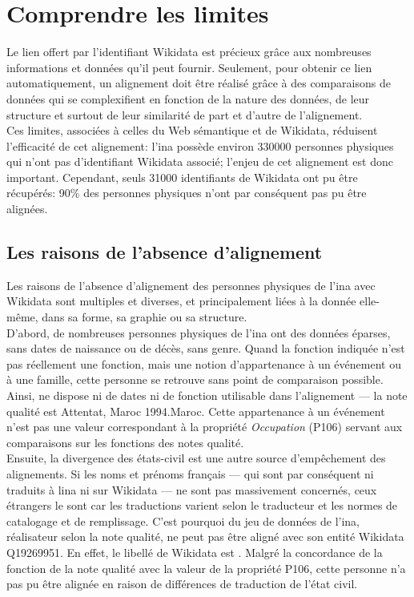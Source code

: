 \section{\label{II-C-4}Comprendre les limites}

Le lien offert par l'identifiant Wikidata est précieux grâce aux nombreuses informations et données qu'il peut fournir. Seulement,  pour obtenir ce lien automatiquement, un alignement doit être réalisé grâce à des comparaisons de données qui se complexifient en fonction de la nature des données, de leur structure et surtout de leur similarité de part et d'autre de l'alignement.\\

Ces limites, associées à celles du Web sémantique et de Wikidata, réduisent  l'efficacité de cet alignement: l'\ac{ina} possède environ 330000 personnes physiques qui n'ont pas d'identifiant Wikidata associé; l'enjeu de cet alignement est donc important. Cependant, seuls 31000 identifiants de Wikidata ont pu être récupérés: 90\% des personnes physiques n'ont par conséquent pas pu être alignées. 

\subsection{\label{II-C-4-a}Les raisons de l'absence d'alignement}

Les raisons de l'absence d'alignement des personnes physiques de l'\ac{ina} avec Wikidata sont multiples et diverses, et principalement liées à la donnée elle-même, dans sa forme, sa graphie ou sa structure.\\

D'abord, de nombreuses personnes physiques de l'\ac{ina} ont des données éparses, sans dates de naissance ou de décès, sans genre. Quand la fonction indiquée n'est pas réellement une fonction, mais une notion d'appartenance à un événement ou à une famille, cette personne se retrouve sans point de comparaison possible. Ainsi,  ne dispose ni de dates ni de fonction utilisable dans l'alignement --- la note qualité est \og Attentat, Maroc 1994.Maroc\fg{}. Cette appartenance à un événement n'est pas une valeur correspondant à la propriété \textit{Occupation} (P106) servant aux comparaisons sur les fonctions des notes qualité.\\

Ensuite, la divergence des états-civil est une autre source d'empêchement des alignements. Si les noms et prénoms français --- qui sont par conséquent ni traduits à l\ac{ina} ni sur Wikidata --- ne sont pas massivement concernés, ceux étrangers le sont car les traductions varient selon le traducteur et les normes de catalogage et de remplissage. C'est pourquoi  du jeu de données de l'\ac{ina}, réalisateur selon la note qualité, ne peut pas être aligné avec son entité Wikidata Q19269951. En effet, le libellé de Wikidata est . Malgré la concordance de la fonction de la note qualité avec la valeur de la propriété P106, cette personne n'a pas pu être alignée en raison de différences de traduction de l'état civil.\\

